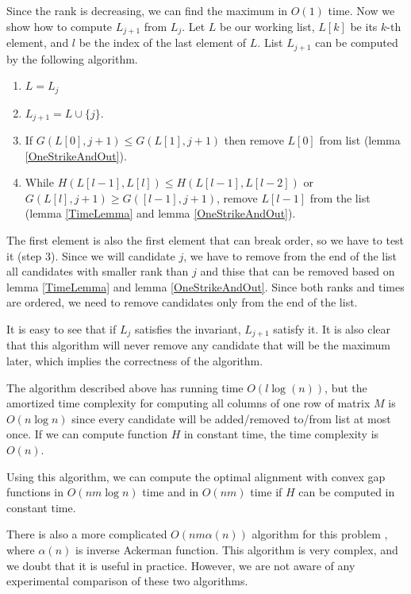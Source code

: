 Since the rank is decreasing, we can find the maximum in $O(1)$ time. Now we show how
to compute $L_{j+1}$ from $L_j$. Let $L$ be our working list,
$L[k]$ be its $k$-th element, and $l$ be the index of the last element of $L$. 
List $L_{j+1}$ can be computed by the following algorithm. 
\begin{enumerate}
\item $L=L_j$
\item $L_{j+1}=L\cup\{j\}$.
\item If $G(L[0],j+1)\leq G(L[1],j+1)$ then remove $L[0]$ from
list (lemma \ref{OneStrikeAndOut}).
\item While $H(L[{l-1}],L[{l}])\leq H(L[l-1],L[l-2])$ or $G(L[l],j+1)\geq
G([l-1],j+1)$, remove $L[l-1]$ from the list (lemma
\ref{TimeLemma} and lemma \ref{OneStrikeAndOut}).
\end{enumerate}

The first element is also the first element that can break order, so we have to
test it (step 3). Since we will candidate $j$, we have to remove from the end of
the list all candidates with smaller rank than $j$ and thise that can be removed
based on lemma \ref{TimeLemma} and lemma \ref{OneStrikeAndOut}.  Since both
ranks and times are ordered, we need to remove candidates only from the end of
the list.

It is easy to see that if $L_j$ satisfies the invariant, $L_{j+1}$  satisfy it.
It is also clear that this algorithm will never remove any candidate that will
be the maximum later, which implies the correctness of the algorithm.

The algorithm described above has running time $O(l\log(n))$, but the amortized time
complexity for computing all columns of one row of matrix $M$ is $O(n\log n)$ since every candidate will
be added/removed to/from list at most once. If we can compute function $H$ in
constant time, the time complexity is $O(n)$.

Using this algorithm, we can compute the optimal alignment with convex gap functions in
$O(nm\log n)$ time and in $O(nm)$ time  if $H$ can be computed
in constant time.

There is also a more complicated $O(nm\alpha(n))$ algorithm for this problem
\cite{Klawe1990}, where $\alpha(n)$ is inverse Ackerman function. This algorithm
is very complex, and we doubt that it is useful in practice. However, we are
not aware of any experimental comparison of these two algorithms.






